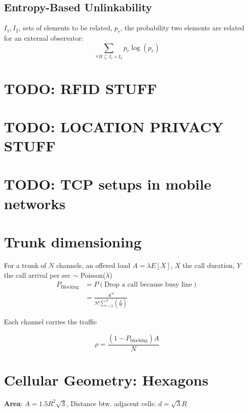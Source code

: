 \documentclass[11pt, a4paper,twocolumn]{scrartcl}
\begin{document}
\subsection{Entropy-Based Unlinkability}
$I_1,I_2$, sets of elements to be related, $p_r$, the probability two elements are related for an external observator:
\begin{equation}
	\sum_{\forall R \subseteq I_1 \times I_2}p_r \log(p_r)
\end{equation}

\section{TODO: RFID STUFF}
\section{TODO: LOCATION PRIVACY STUFF}
\section{TODO: TCP setups in mobile networks}

\section{Trunk dimensioning}
For a trunk of $N$ channels, an offered load $A=\lambda E[X]$, $X$ the call duration, $Y$ the call arrival per sec $\sim$ Poisson($\lambda$) 
\begin{align*}
	P_\textrm{Blocking} &= P(\textrm{Drop a call because busy line})  \\
	&= \frac{A^N}{N!\sum^N_{i=0}(\frac{A^i}{i!})}
\end{align*}

Each channel carries the traffic 

\begin{equation}
	\rho = \frac{(1 - P_\textrm{blocking})A}{N}
\end{equation}

\section{Cellular Geometry: Hexagons}

\textbf{Area}: $A=1.5R^2\sqrt{3}$, Distance btw. adjacent cells: $d=\sqrt{3}R$
\end{document}
